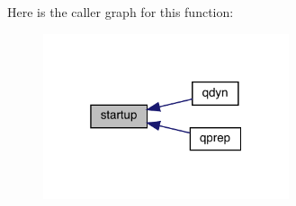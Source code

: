 Here is the caller graph for this function\-:
\nopagebreak
\begin{figure}[H]
\begin{center}
\leavevmode
\includegraphics[width=205pt]{qcalc_8f90_a1c4c0aa57a695916669518b5bf72e5bb_icgraph}
\end{center}
\end{figure}


